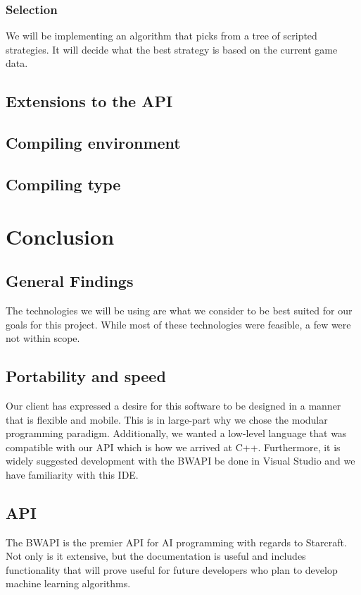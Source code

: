 \documentclass[10pt,letterpaper,onecolumn,draftclsnofoot]{IEEEtran}
\begin{document}
\subsubsection{Selection}
We will be implementing an algorithm that picks from a tree of scripted strategies. It will decide what the best strategy is based on the current game data.


\subsection{Extensions to the API}

\subsection{Compiling environment}

\subsection{Compiling type}

\section{Conclusion}
\subsection{General Findings}
The technologies we will be using are what we consider to be best suited for our goals for this project. While most of these technologies were feasible, a few were not within scope. 

\subsection{Portability and speed}
Our client has expressed a desire for this software to be designed in a manner that is flexible and mobile. This is in large-part why we chose the modular programming paradigm. Additionally, we wanted a low-level language that was compatible with our API which is how we arrived at C++. Furthermore, it is widely suggested development with the BWAPI be done in Visual Studio and we have familiarity with this IDE.

\subsection{API}
The BWAPI is the premier API for AI programming with regards to Starcraft. Not only is it extensive, but the documentation is useful and includes functionality that will prove useful for future developers who plan to develop machine learning algorithms.
\end{document}
